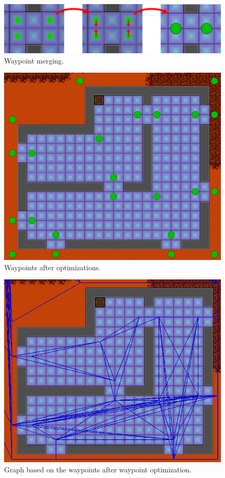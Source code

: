 \begin{figure}[H]
	\includegraphics[width=\textwidth]{figures/astar/waypointMerge}
	\caption{Waypoint merging.}
	\label{waypointMerge}
\end{figure}

\begin{figure}[H]
	\includegraphics[width=\textwidth]{figures/astar/optimizedWaypoints}
	\caption{Waypoints after optimizations.}
	\label{waypointOpt}
\end{figure}

\begin{figure}[H]
	\includegraphics[width=\textwidth]{figures/astar/optimizedWaypointsGraph}
	\caption{Graph based on the waypoints after waypoint optimization.}
	\label{waypointgraphOpt}
\end{figure}


